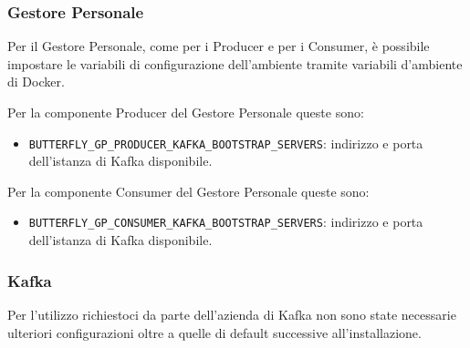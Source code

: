 	\subsubsection{Gestore Personale}
	Per il Gestore Personale, come per i Producer e per i Consumer, è possibile impostare le variabili di configurazione dell'ambiente tramite variabili d'ambiente di Docker. \par

	Per la componente Producer del Gestore Personale queste sono:
	\begin{itemize}
		\item\texttt{BUTTERFLY\_GP\_PRODUCER\_KAFKA\_BOOTSTRAP\_SERVERS}: indirizzo e porta dell'istanza di Kafka disponibile.
	\end{itemize}

	Per la componente Consumer del Gestore Personale queste sono:
	\begin{itemize}
		\item\texttt{BUTTERFLY\_GP\_CONSUMER\_KAFKA\_BOOTSTRAP\_SERVERS}: indirizzo e porta dell'istanza di Kafka disponibile.
	\end{itemize}


	\subsubsection{Kafka}
	Per l'utilizzo richiestoci da parte dell'azienda di Kafka non sono state necessarie ulteriori configurazioni oltre a quelle di default successive all'installazione.
